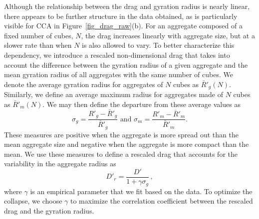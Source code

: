 Although the relationship between the drag and gyration radius is nearly linear, there appears to be further structure in the data obtained, as is particularly visible for CCA in Figure~\ref{fig_drag_raw}(b). For an aggregate composed of a fixed number of cubes, $N$, the drag increases linearly with aggregate size, but at a slower rate than when $N$ is also allowed to vary. To better characterize this dependency, we introduce a rescaled non-dimensional drag that takes into account the difference between the gyration radius of a given aggregate and the mean gyration radius of all aggregates with the same number of cubes.
We denote the average gyration radius for aggregates of $N$ cubes as $\bar{R}'_g(N)$. Similarly, 
we define an average maximum radius for aggregates made of $N$ cubes as $\bar{R}'_m(N)$. We may then define the departure from these average values as 
\[
\sigma_g = \frac{R'_g - \bar{R}'_g}{\bar{R}'_g} \text{\ \ \ \ \ \ and \ \ \ \ \ \ } \sigma_m = \frac{R'_m - \bar{R}'_m}{\bar{R}'_m}.
\]
These measures are positive when the aggregate is more spread out than the mean aggregate size and negative when the aggregate is more compact than the mean. We use these measures to define a rescaled drag that accounts for the variability in the aggregate radius as 
\begin{equation}
D'_r = \frac{D'}{1 + \gamma \sigma_g} \, , 
\label{def_drag_rescaled}
\end{equation}
where $\gamma$ is an empirical parameter that we fit based on the data. To optimize the collapse, we choose $\gamma$ to maximize the correlation coefficient between the rescaled drag and the gyration radius.  


